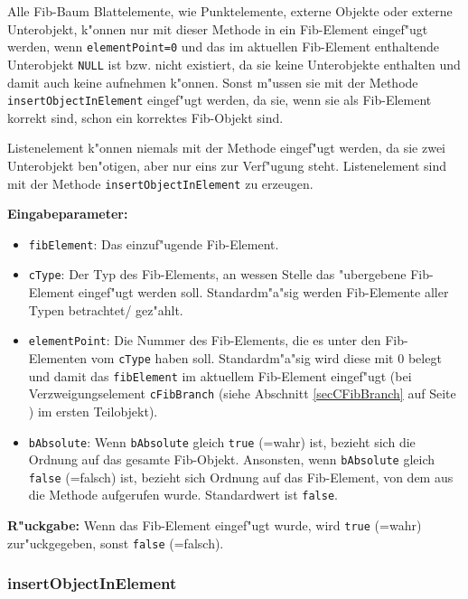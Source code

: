 Alle Fib-Baum Blattelemente, wie Punktelemente, externe Objekte oder externe Unterobjekt, k"onnen nur mit dieser Methode in ein Fib-Element eingef"ugt werden, wenn \verb|elementPoint=0| und das im aktuellen Fib-Element enthaltende Unterobjekt \verb|NULL| ist bzw. nicht existiert, da sie keine Unterobjekte enthalten und damit auch keine aufnehmen k"onnen.
Sonst m"ussen sie mit der Methode \verb|insertObjectInElement| eingef"ugt werden, da sie, wenn sie als Fib-Element korrekt sind, schon ein korrektes Fib-Objekt sind.

Listenelement k"onnen niemals mit der Methode eingef"ugt werden, da sie zwei Unterobjekt ben"otigen, aber nur eins zur Verf"ugung steht. Listenelement sind mit der Methode \verb|insertObjectInElement| zu erzeugen.

\bigskip\noindent
\textbf{Eingabeparameter:}
\begin{itemize}
 \item \verb|fibElement|: Das einzuf"ugende Fib-Element.
 \item \verb|cType|: Der Typ des Fib-Elements, an wessen Stelle das "ubergebene Fib-Element eingef"ugt werden soll. Standardm"a"sig werden Fib-Elemente aller Typen betrachtet/ gez"ahlt.
 \item \verb|elementPoint|: Die Nummer des Fib-Elements, die es unter den Fib-Elementen vom \verb|cType| haben soll. Standardm"a"sig wird diese mit $0$ belegt und damit das \verb|fibElement| im aktuellem Fib-Element eingef"ugt (bei Verzweigungselement \verb|cFibBranch| (siehe Abschnitt \ref{secCFibBranch} auf Seite \pageref{secCFibBranch} ) im ersten Teilobjekt).
 \item \verb|bAbsolute|: Wenn \verb|bAbsolute| gleich \verb|true| (=wahr) ist, bezieht sich die Ordnung auf das gesamte Fib-Objekt. Ansonsten, wenn \verb|bAbsolute| gleich \verb|false| (=falsch) ist, bezieht sich Ordnung auf das Fib-Element, von dem aus die Methode aufgerufen wurde. Standardwert ist \verb|false|.
\end{itemize}

\bigskip\noindent
\textbf{R"uckgabe:} Wenn das Fib-Element eingef"ugt wurde, wird \verb|true| (=wahr) zur"uckgegeben, sonst \verb|false| (=falsch).


\subsubsection{insertObjectInElement}

